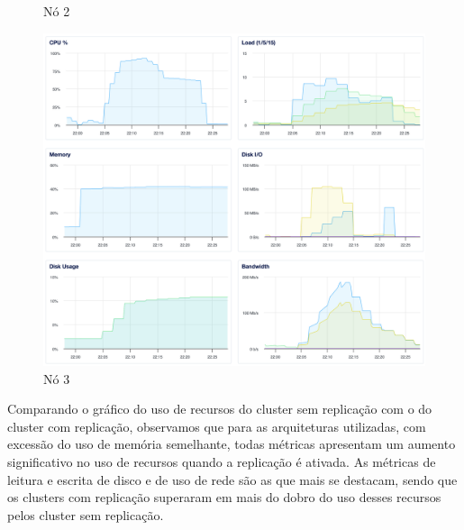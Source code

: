 \begin{figure}[H]
\begin{minipage}{0.32\linewidth}
    \caption{Nó 2}
  \end{minipage}
  \hfill
  \begin{minipage}{0.32\linewidth}
    \centering
    \includegraphics[width=\linewidth]{imgs/3-3-03.png}
    \caption{Nó 3}
  \end{minipage}
\end{figure}

Comparando o gráfico do uso de recursos do cluster sem replicação com o do cluster com replicação, observamos que para as arquiteturas utilizadas,
com excessão do uso de memória semelhante, todas métricas apresentam um aumento significativo no uso de recursos quando a replicação é ativada.
As métricas de leitura e escrita de disco e de uso de rede são as que mais se destacam, sendo que os clusters com replicação superaram em mais do dobro do uso desses recursos pelos cluster sem replicação.
